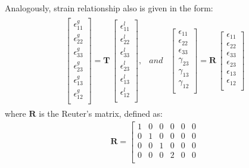 \documentclass[a4paper,12pt]{article}
\begin{document}
{Analogously, strain relationship also is given in the form:
\begin{eqnarray}
\begin{array}{ccc}
\left [
\begin{array}{c}
\epsilon^g_{11}\\
\epsilon^g_{22}\\ 
\epsilon^g_{33}\\ 
\epsilon^g_{23}\\
\epsilon^g_{13}\\
\epsilon^g_{12}\\
\end{array}
\right ]=
\textbf{T}\,\left [
\begin{array}{c}
\epsilon^l_{11}\\
\epsilon^l_{22}\\ 
\epsilon^l_{33}\\
\epsilon^l_{23}\\
\epsilon^l_{13}\\
\epsilon^l_{12}\\
\end{array}
\right ], & and & \left [
\begin{array}{c}
\epsilon_{11}\\
\epsilon_{22}\\ 
\epsilon_{33}\\ 
\gamma_{23}\\
\gamma_{13}\\
\gamma_{12}\\
\end{array}
\right ]=
\textbf{R}\,\left [
\begin{array}{c}
\epsilon_{11}\\
\epsilon_{22}\\ 
\epsilon_{33}\\
\epsilon_{23}\\
\epsilon_{13}\\
\epsilon_{12}\\
\end{array}
\right ]
\end{array}
\label{eq:strain}
\end{eqnarray}
where \(\textbf{R}\) is the Reuter's matrix, defined as:
\begin{eqnarray}
\textbf{R} = \left [
\begin{array}{cccccc}
1 & 0 & 0 & 0 & 0 & 0\\
0 & 1 & 0 & 0 & 0 & 0\\
0 & 0  & 1 & 0 & 0 & 0\\
0 & 0 & 0 & 2 & 0 & 0\\

\end{array}
\end{eqnarray}}
\end{document}
